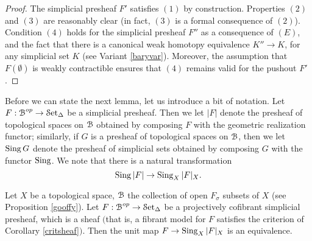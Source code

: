 \begin{proof}
The simplicial presheaf $F'$ satisfies $(1)$ by construction. Properties $(2)$ and $(3)$ are reasonably clear (in fact, $(3)$ is a formal consequence of $(2)$). Condition $(4)$ holds for the simplicial presheaf $F''$ as a consequence of $(E)$, and the fact that there is a canonical
weak homotopy equivalence $K'' \rightarrow K$, for any simplicial set $K$ (see Variant \ref{baryvar}).
Moreover, the assumption that $F(\emptyset)$ is weakly contractible ensures that $(4)$ remains valid for the pushout $F'$.
\end{proof}

Before we can state the next lemma, let us introduce a bit of notation. Let $F: \operatorname{\mathcal{B}}^{op} \rightarrow \operatorname{\mathcal{S}et_{\Delta}}$ be a simplicial presheaf. Then we let $|F|$ denote the presheaf of topological spaces on $\operatorname{\mathcal{B}}$ obtained by composing $F$ with the geometric realization functor; similarly, if 
$G$ is a presheaf of topological spaces on $\operatorname{\mathcal{B}}$, then we let $\operatorname{Sing} G$ denote the presheaf of simplicial sets obtained by composing $G$ with the functor $\operatorname{Sing}$. We note that there is a natural transformation
$$ \operatorname{Sing} |F| \rightarrow \operatorname{Sing}_{X} |F|_X.$$

\begin{lemma}\label{hardd}
Let $X$ be a topological space, $\operatorname{\mathcal{B}}$ the collection of open $F_{\sigma}$ subsets of 
$X$ (see Proposition \ref{gooffy}). Let $F: \operatorname{\mathcal{B}}^{op} \rightarrow \operatorname{\mathcal{S}et_{\Delta}}$ be a 
projectively cofibrant simplicial presheaf, which is a sheaf $($that is, a fibrant model for $F$ satisfies
the criterion of Corollary \ref{critsheaf}$)$. 
Then the unit map $F \rightarrow \operatorname{Sing}_{X} |F|_{X}$ is an equivalence.
\end{lemma}

